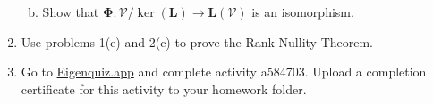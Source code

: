 \documentclass[12pt]{amsart}
\newcommand{\1}{\mathbbm{1}}
\newcounter{Theorem}
\numberwithin{equation}{section}
\numberwithin{Theorem}{section}
\theoremstyle{plain} %
\theoremstyle{definition}
\theoremstyle{remark}
\begin{document}
\begin{enumerate}[1.]
\begin{enumerate}[(a)]
\bigskip

\item Show that \(\mathbf{\Phi}: \mathcal{V}/\operatorname{ker}(\mathbf{L})\to\mathbf{L}(\mathcal{V})\) is an isomorphism.

\bigskip

\end{enumerate}

\item Use problems 1(e) and 2(c) to prove the Rank-Nullity Theorem.

\bigskip

\item Go to \href{https://eigenquiz.app/}{Eigenquiz.app} and complete activity a584703. Upload a completion certificate for this activity to your homework folder.

\end{enumerate}
\end{document}
